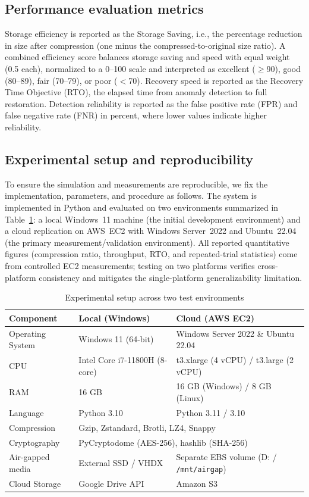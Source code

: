 \documentclass{iaesarticle}
\begin{document}
\subsection{Performance evaluation metrics}
Storage efficiency is reported as the Storage Saving, i.e., the percentage reduction in size after compression (one minus the compressed-to-original size ratio). A combined efficiency score balances storage saving and speed with equal weight (0.5 each), normalized to a 0--100 scale and interpreted as excellent ($\geq$90), good (80--89), fair (70--79), or poor ($<$70). Recovery speed is reported as the Recovery Time Objective (RTO), the elapsed time from anomaly detection to full restoration. Detection reliability is reported as the false positive rate (FPR) and false negative rate (FNR) in percent, where lower values indicate higher reliability.

\subsection{Experimental setup and reproducibility}
\label{sec:repro}
To ensure the simulation and measurements are reproducible, we fix the implementation, parameters, and procedure as follows. The system is implemented in Python and evaluated on two environments summarized in Table~\ref{tab:experimental_setup}: a local Windows~11 machine (the initial development environment) and a cloud replication on AWS~EC2 with Windows Server~2022 and Ubuntu~22.04 (the primary measurement/validation environment). All reported quantitative figures (compression ratio, throughput, RTO, and repeated-trial statistics) come from controlled EC2 measurements; testing on two platforms verifies cross-platform consistency and mitigates the single-platform generalizability limitation.

\begin{table}[htbp]
\centering
\fontsize{8pt}{10pt}\selectfont
\caption{Experimental setup across two test environments}
\label{tab:experimental_setup}
\begin{tabularx}{\textwidth}{@{}l X X@{}}
\hline
\textbf{Component} & \textbf{Local (Windows)} & \textbf{Cloud (AWS EC2)} \\
\hline
Operating System & Windows 11 (64-bit) & Windows Server 2022 \& Ubuntu 22.04 \\
CPU & Intel Core i7-11800H (8-core) & t3.xlarge (4 vCPU) / t3.large (2 vCPU) \\
RAM & 16 GB & 16 GB (Windows) / 8 GB (Linux) \\
Language & Python 3.10 & Python 3.11 / 3.10 \\
Compression & \multicolumn{2}{l}{Gzip, Zstandard, Brotli, LZ4, Snappy} \\
Cryptography & \multicolumn{2}{l}{PyCryptodome (AES-256), hashlib (SHA-256)} \\
Air-gapped media & External SSD / VHDX & Separate EBS volume (D: / \texttt{/mnt/airgap}) \\
Cloud Storage & Google Drive API & Amazon S3 \\
\hline
\end{tabularx}
\end{table}
\end{document}
